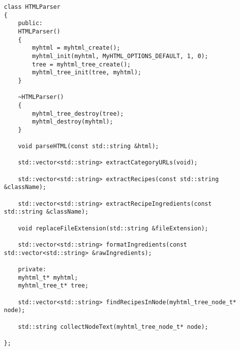 \begin{center}
	\captionsetup{justification=raggedright,singlelinecheck=off}
	\begin{lstlisting}[caption=Интерфейс класса HTMLParser]
class HTMLParser
{
	public:
	HTMLParser()
	{
		myhtml = myhtml_create();
		myhtml_init(myhtml, MyHTML_OPTIONS_DEFAULT, 1, 0);
		tree = myhtml_tree_create();
		myhtml_tree_init(tree, myhtml);
	}
	
	~HTMLParser()
	{
		myhtml_tree_destroy(tree);
		myhtml_destroy(myhtml);
	}
	
	void parseHTML(const std::string &html);
	
	std::vector<std::string> extractCategoryURLs(void);
	
	std::vector<std::string> extractRecipes(const std::string &className);
	
	std::vector<std::string> extractRecipeIngredients(const std::string &className);
	
	void replaceFileExtension(std::string &fileExtension);
	
	std::vector<std::string> formatIngredients(const std::vector<std::string> &rawIngredients);
	
	private:
	myhtml_t* myhtml;
	myhtml_tree_t* tree;
	
	std::vector<std::string> findRecipesInNode(myhtml_tree_node_t* node);
	
	std::string collectNodeText(myhtml_tree_node_t* node);
	
};
	\end{lstlisting}
\end{center}

